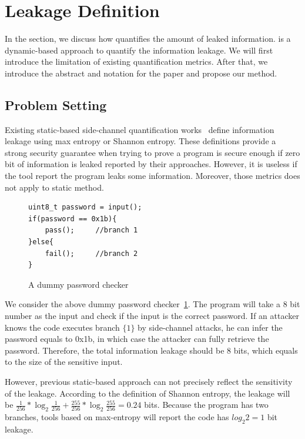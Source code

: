 \section{\tool{} Leakage Definition}
In the section, we discuss how \tool{} quantifies the amount of
leaked information. \tool{} is a dynamic-based approach to 
quantify the information leakage. We will first introduce 
the limitation of existing quantification metrics. After
that, we introduce the abstract and notation for the paper 
and propose our method.

\subsection{Problem Setting}
Existing static-based side-channel quantification works~\cite{182946,Wichelmann:2018:MFF:3274694.3274741 } define information leakage
using max entropy or Shannon entropy. These definitions provide a strong security guarantee
when trying to prove a program is secure enough if zero bit of information is leaked 
reported by their approaches. However, it is useless if the tool report the program leaks
some information. Moreover, those metrics does not apply to static method.


\begin{figure}[h!]
    \centering
\begin{lstlisting}[xleftmargin=.03\textwidth,xrightmargin=.01\textwidth]
uint8_t password = input();
if(password == 0x1b){
    pass();     //branch 1
}else{
    fail();     //branch 2
}
\end{lstlisting}
\caption{A dummy password checker}
\label{figure:password checker}
\end{figure}

We consider the above dummy password checker~\ref{figure:password checker}.
The program will take a 8 bit number as the input and check if the input is the
correct password. 
If an attacker knows the
code executes branch $\{{1\}}$ by side-channel attacks, he can infer the password equals to 0x1b,
in which case the attacker can fully retrieve the password.
Therefore, the total information leakage should be 8 bits, which equals to the size
of the sensitive input. 

However, previous static-based approach can not precisely reflect the sensitivity of the leakage.
According to the definition of Shannon entropy, the leakage will be $\frac{1}{256}*\log_{2}\frac{1}{256} + 
\frac{255}{256} *\log_{2}\frac{255}{256}= 0.24$ bits. Because the program has two branches, tools
based on max-entropy will report the code has $log_2{2} = 1$ bit leakage.

